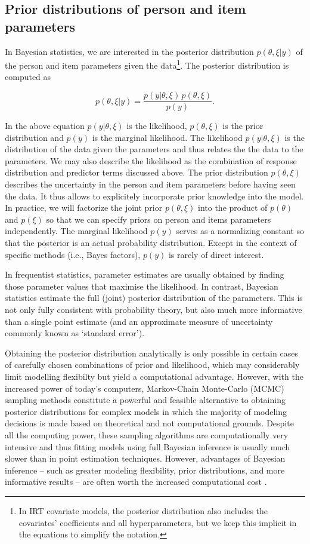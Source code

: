 \documentclass[jss]{jss}
\begin{document}
\hypertarget{priors}{%
\subsection{Prior distributions of person and item
parameters}\label{priors}}

In Bayesian statistics, we are interested in the posterior distribution
\(p(\theta, \xi | y)\) of the person and item parameters given the
data\footnote{In IRT covariate models, the posterior distribution also includes
the covariates' coefficients and all hyperparameters, but we keep this implicit
in the equations to simplify the notation.}. The posterior distribution
is computed as

\[
p(\theta, \xi | y) = \frac{p(y | \theta, \xi) \, p(\theta, \xi)}{p(y)}.
\]

In the above equation \(p(y | \theta, \xi)\) is the likelihood,
\(p(\theta, \xi)\) is the prior distribution and \(p(y)\) is the
marginal likelihood. The likelihood \(p(y | \theta, \xi)\) is the
distribution of the data given the parameters and thus relates the the
data to the parameters. We may also describe the likelihood as the
combination of response distribution and predictor terms discussed
above. The prior distribution \(p(\theta, \xi)\) describes the
uncertainty in the person and item parameters before having seen the
data. It thus allows to explicitely incorporate prior knowledge into the
model. In practice, we will factorize the joint prior \(p(\theta, \xi)\)
into the product of \(p(\theta)\) and \(p(\xi)\) so that we can specify
priors on person and items parameters independently. The marginal
likelihood \(p(y)\) serves as a normalizing constant so that the
posterior is an actual probability distribution. Except in the context
of specific methods (i.e., Bayes factors), \(p(y)\) is rarely of direct
interest.

In frequentist statistics, parameter estimates are usually obtained by
finding those parameter values that maximise the likelihood. In
contrast, Bayesian statistics estimate the full (joint) posterior
distribution of the parameters. This is not only fully consistent with
probability theory, but also much more informative than a single point
estimate (and an approximate measure of uncertainty commonly known as
`standard error').

Obtaining the posterior distribution analytically is only possible in
certain cases of carefully chosen combinations of prior and likelihood,
which may considerably limit modelling flexibilty but yield a
computational advantage. However, with the increased power of today's
computers, Markov-Chain Monte-Carlo (MCMC) sampling methods constitute a
powerful and feasible alternative to obtaining posterior distributions
for complex models in which the majority of modeling decisions is made
based on theoretical and not computational grounds. Despite all the
computing power, these sampling algorithms are computationally very
intensive and thus fitting models using full Bayesian inference is
usually much slower than in point estimation techniques. However,
advantages of Bayesian inference -- such as greater modeling
flexibility, prior distributions, and more informative results -- are
often worth the increased computational cost \citep{gelman2013}.
\end{document}
